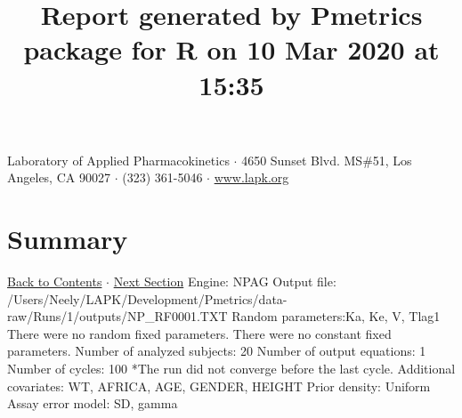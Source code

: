 \documentclass{article}
\title{Report generated by Pmetrics package for R on 10 Mar 2020 at 15:35 }
\date{}
\begin{document}
              \maketitle 
Laboratory of Applied Pharmacokinetics $\cdot$ 4650 Sunset Blvd. MS\#51, Los Angeles, CA 90027 $\cdot$ (323) 361-5046 $\cdot$ \href{http://www.lapk.org}{www.lapk.org} 
\hypertarget{tableofcontents}{}
        \tableofcontents
        \newpage 
\section{Summary} \hyperlink{tableofcontents}{Back to Contents} $\cdot$ \hyperlink{cycleinfo}{Next Section}\newline
 \newline 
Engine: NPAG\newline 
Output file: /Users/Neely/LAPK/Development/Pmetrics/data-raw/Runs/1/outputs/NP\_RF0001.TXT\newline 
Random parameters:Ka, Ke, V, Tlag1\newline 
There were no random fixed parameters. \newline 
There were no constant fixed parameters. \newline 
Number of analyzed subjects:  20 \newline 
Number of output equations:  1 \newline 
Number of cycles:  100     *The run did not converge before the last cycle. \newline 
Additional covariates:  WT, AFRICA, AGE, GENDER, HEIGHT \newline 
Prior density: Uniform \newline Assay error model: SD, gamma \newline  \newline 
\newpage
            \hypertarget{cycleinfo}{}
            
\end{document}
